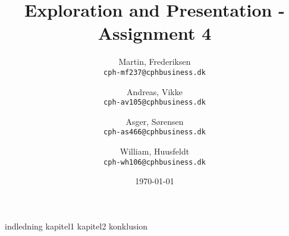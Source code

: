 \documentclass[10pt]{report}
\title{Exploration and Presentation - Assignment 4}
\author{
    Martin, Frederiksen\\
    \texttt{cph-mf237@cphbusiness.dk}\\
    \and
    Andreas, Vikke\\
    \texttt{cph-av105@cphbusiness.dk}\\
    \and
    Asger, Sørensen\\
    \texttt{cph-as466@cphbusiness.dk}\\
    \and
    William, Huusfeldt\\
    \texttt{cph-wh106@cphbusiness.dk}\\
  }
\date{\today}
\begin{document}
\hypersetup{pageanchor=false}
\begin{titlepage}
\maketitle
\end{titlepage}

\hypersetup{pageanchor=true}
\tableofcontents
\newpage
{indledning}
{kapitel1}
{kapitel2}
{konklusion}
\end{document}
